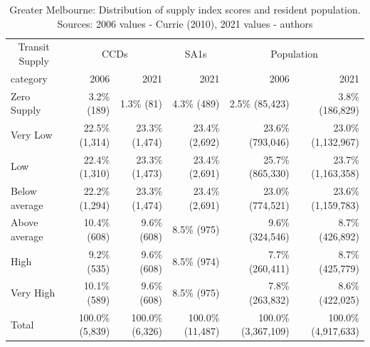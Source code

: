\documentclass[preprint, 3p,
authoryear]{elsarticle} %
\begin{document}
\begin{table}

\caption{\label{tab:Greater_Melbourne_SA1_2021_table}Greater Melbourne: Distribution of supply index scores and resident population. Sources: 2006 values - Currie (2010), 2021 values - authors}
\centering
\begin{tabular}[t]{l|r|r|r|r|r}
\hline
\multicolumn{1}{c|}{Transit Supply} & \multicolumn{2}{c|}{CCDs} & \multicolumn{1}{c|}{SA1s} & \multicolumn{2}{c}{Population} \\
\cline{1-1} \cline{2-3} \cline{4-4} \cline{5-6}
category & 2006 & 2021 & 2021 & 2006 & 2021\\
\hline
Zero Supply & 3.2\%   (189) & 1.3\%    (81) & 4.3\%    (489) & 2.5\%    (85,423) & 3.8\%   (186,829)\\
\hline
Very Low & 22.5\% (1,314) & 23.3\% (1,474) & 23.4\%  (2,692) & 23.6\%   (793,046) & 23.0\% (1,132,967)\\
\hline
Low & 22.4\% (1,310) & 23.3\% (1,473) & 23.4\%  (2,691) & 25.7\%   (865,330) & 23.7\% (1,163,358)\\
\hline
Below average & 22.2\% (1,294) & 23.3\% (1,474) & 23.4\%  (2,691) & 23.0\%   (774,521) & 23.6\% (1,159,783)\\
\hline
Above average & 10.4\%   (608) & 9.6\%   (608) & 8.5\%    (975) & 9.6\%   (324,546) & 8.7\%   (426,892)\\
\hline
High & 9.2\%   (535) & 9.6\%   (608) & 8.5\%    (974) & 7.7\%   (260,411) & 8.7\%   (425,779)\\
\hline
Very High & 10.1\%   (589) & 9.6\%   (608) & 8.5\%    (975) & 7.8\%   (263,832) & 8.6\%   (422,025)\\
\hline
Total & 100.0\% (5,839) & 100.0\% (6,326) & 100.0\% (11,487) & 100.0\% (3,367,109) & 100.0\% (4,917,633)\\
\hline
\end{tabular}
\end{table}
\end{document}
